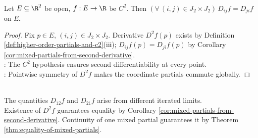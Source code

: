 \begin{corollary} \label{cor:c2-mixed-partials-commute} \\
Let $E\subseteq\R^2$ be open, $f:E\to\R$ be $C^2$. Then $(\forall\,(i,j)\in J_2\times J_2)\,D_{ij}f=D_{ji}f$ on $E$.
\begin{proof}
Fix $p\in E$, $(i,j)\in J_2\times J_2$. Derivative $D^2f(p)$ exists by Definition \ref{def:higher-order-partials-and-c2}(iii); $D_{ij}f(p)=D_{ji}f(p)$ by Corollary \ref{cor:mixed-partials-from-second-derivative}.\\
: The $C^2$ hypothesis ensures second differentiability at every point.\\
: Pointwise symmetry of $D^2f$ makes the coordinate partials commute globally.
\end{proof}
\end{corollary}

\begin{perspective} \label{per:mixed-partials-need-hypotheses}
\\
The quantities $D_{12}f$ and $D_{21}f$ arise from different iterated limits.\\
Existence of $D^2f$ guarantees equality by Corollary \ref{cor:mixed-partials-from-second-derivative}. Continuity of one mixed partial guarantees it by Theorem \ref{thm:equality-of-mixed-partials}.
\end{perspective}

